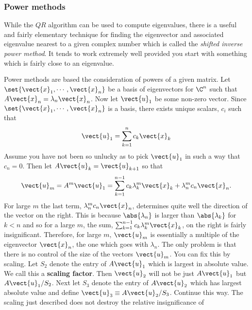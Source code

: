 \subsubsection{Power methods}

While the $QR$ algorithm can be used to compute eigenvalues, there is a useful and fairly elementary technique for
finding the eigenvector and associated eigenvalue nearest to a given complex number which
is called the {\em shifted inverse power method}. It tends to work extremely well provided you
start with something which is fairly close to an eigenvalue.

Power methods are based the consideration of powers of a given matrix. Let $
\set{
\vect{x}_{1},\cdots ,\vect{x}_{n}} $ be a basis of eigenvectors for $
\C^{n}$ such that $A\vect{x}_{n}=\lambda _{n}\vect{x}_{n}$. Now let $
\vect{u}_{1}$ be some non-zero vector. Since $\set{\vect{x}_{1},\cdots ,\vect{x}_{n}} $ is a basis, there exists unique scalars, $c_{i}$ such that 
\begin{equation*}
\vect{u}_{1}=\sum_{k=1}^{n}c_{k}\vect{x}_{k}
\end{equation*}
Assume you have not been so unlucky as to pick $\vect{u}_{1}$ in such a way
that $c_{n}=0$. Then let $A\vect{u}_{k}=\vect{u}_{k+1}$ so that 
\begin{equation}
\vect{u}_{m}=A^{m}\vect{u}_{1}=\sum_{k=1}^{n-1}c_{k}\lambda _{k}^{m}\vect{x}
_{k}+\lambda _{n}^{m}c_{n}\vect{x}_{n}.  \label{20-may-e1}
\end{equation}
For large $m$ the last term, $\lambda _{n}^{m}c_{n}\vect{x}_{n}$, determines
quite well the direction of the vector on the right. This is because $
\abs{\lambda _{n}}$ is larger than $\abs{\lambda
_{k}}$ for $k<n$ and so for a large $m$, the sum, $\sum_{k=1}^{n-1}c_{k}\lambda _{k}^{m}\vect{x}_{k}$, on the right is fairly
insignificant. Therefore, for large $m$, $\vect{u}_{m}$ is essentially a
multiple of the eigenvector $\vect{x}_{n}$, the one which goes with $\lambda
_{n}$. The only problem is that there is no control of the size of the
vectors $\vect{u}_{m}$. You can fix this by scaling. Let $S_{2}$ denote the
entry of $A\vect{u}_{1}$ which is largest in absolute value. We call this a 
 \textbf{scaling factor}. Then $\vect{u}_{2}$ will not be just $A\vect{u}_{1}$ but $A\vect{u}_{1}/S_{2}$. Next
let $S_{3}$ denote the entry of $A\vect{u}_{2}$ which has largest absolute
value and define $\vect{u}_{3}\equiv A\vect{u}_{2}/S_{3}$. Continue this way.
The scaling just described does not destroy the relative insignificance of
